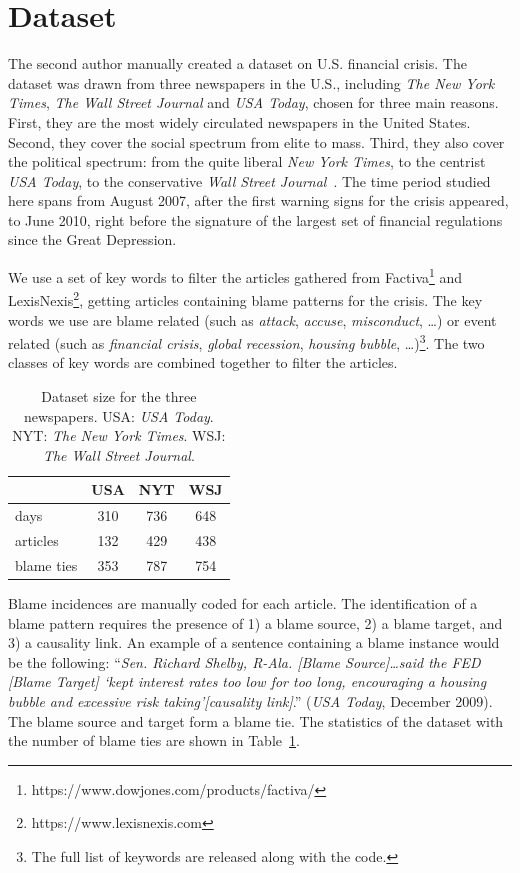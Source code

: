 \documentclass[11pt,a4paper]{article}
\begin{document}
\section{Dataset}
\label{dataset}
The second author manually created a dataset on U.S. financial crisis. The dataset was drawn from three newspapers in the U.S., including {\it The New York Times}, {\it The Wall Street Journal} and {\it USA Today}, chosen for three main reasons. First, they are the most widely circulated newspapers in the United States. Second, they cover the social spectrum from elite to mass. Third, they also cover the political spectrum: from the quite liberal {\it New York Times}, to the centrist {\it USA Today}, to the conservative {\it Wall Street Journal}~\cite{gentzkow2010drives,groseclose2005measure}. The time period studied here spans from August 2007, after the first warning signs for the crisis appeared, to June 2010, right before the signature of the largest set of financial regulations since the Great Depression.

We use a set of key words to filter the articles gathered from Factiva\footnote{https://www.dowjones.com/products/factiva/} and LexisNexis\footnote{https://www.lexisnexis.com}, getting articles containing blame patterns for the crisis. The key words we use are blame related (such as {\it attack}, {\it accuse}, {\it misconduct}, \ldots) or event related (such as {\it financial crisis}, {\it global recession}, {\it housing bubble}, \ldots)\footnote{The full list of keywords are released along with the code.}. The two classes of key words are combined together to filter the articles.

\begin{table}[t!]
\centering
\begin{tabular}{l c c c} 
 \hline
 & {\bf USA} &  {\bf NYT}  & {\bf WSJ} \\ 
 \hline\hline
 days & 310 & 736 & 648 \\ 
 articles & 132 & 429 & 438 \\
 blame ties & 353 & 787 & 754 \\
 \hline
\end{tabular}
\caption{Dataset size for the three newspapers. USA: {\it USA Today}. NYT: {\it The New York Times}. WSJ: {\it The Wall Street Journal}.}
\label{table:dataset}
\end{table}

Blame incidences are manually coded for each article. The identification of a blame pattern requires the presence of 1) a blame source, 2) a blame target, and 3) a causality link. An example of a sentence containing a blame instance would be the following: ``{\it Sen. Richard Shelby, R-Ala. [Blame Source]\ldots said the FED [Blame Target] `kept interest rates too low for too long, encouraging a housing bubble and excessive risk taking'[causality link]}.'' ({\it USA Today}, December 2009). The blame source and target form a blame tie. The statistics of the dataset with the number of blame ties are shown in Table~\ref{table:dataset}.
\end{document}
